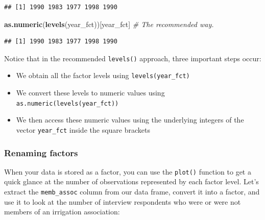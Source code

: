 \documentclass[
]{article}
\newenvironment{Shaded}{\begin{snugshade}}{\end{snugshade}}
\newcommand{\CommentTok}[1]{\textcolor[rgb]{0.56,0.35,0.01}{\textit{#1}}}
\newcommand{\DocumentationTok}[1]{\textcolor[rgb]{0.56,0.35,0.01}{\textbf{\textit{#1}}}}
\newcommand{\FunctionTok}[1]{\textcolor[rgb]{0.13,0.29,0.53}{\textbf{#1}}}
\newcommand{\NormalTok}[1]{#1}
\newcommand{\OtherTok}[1]{\textcolor[rgb]{0.56,0.35,0.01}{#1}}
\newcommand{\SpecialCharTok}[1]{\textcolor[rgb]{0.81,0.36,0.00}{\textbf{#1}}}
\providecommand{\tightlist}{%
  \setlength{\itemsep}{0pt}\setlength{\parskip}{0pt}}
\begin{document}
\begin{verbatim}
## [1] 1990 1983 1977 1998 1990
\end{verbatim}

\begin{Shaded}
\begin{Highlighting}[]
\FunctionTok{as.numeric}\NormalTok{(}\FunctionTok{levels}\NormalTok{(year\_fct))[year\_fct]   }\CommentTok{\# The recommended way.}
\end{Highlighting}
\end{Shaded}

\begin{verbatim}
## [1] 1990 1983 1977 1998 1990
\end{verbatim}

Notice that in the recommended \texttt{levels()} approach, three
important steps occur:

\begin{itemize}
\tightlist
\item
  We obtain all the factor levels using \texttt{levels(year\_fct)}
\item
  We convert these levels to numeric values using
  \texttt{as.numeric(levels(year\_fct))}
\item
  We then access these numeric values using the underlying integers of
  the vector \texttt{year\_fct} inside the square brackets
\end{itemize}

\subsubsection{Renaming factors}\label{renaming-factors}

When your data is stored as a factor, you can use the \texttt{plot()}
function to get a quick glance at the number of observations represented
by each factor level. Let's extract the \texttt{memb\_assoc} column from
our data frame, convert it into a factor, and use it to look at the
number of interview respondents who were or were not members of an
irrigation association:

\begin{Shaded}
\end{Shaded}
\end{document}
